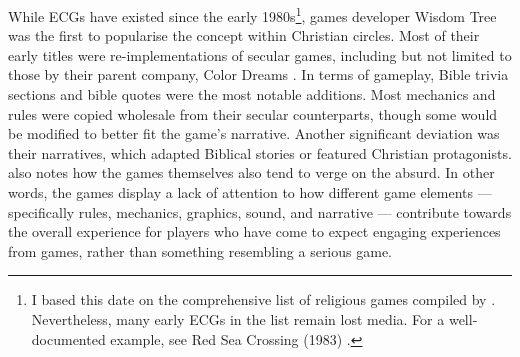 While \acp{ECG} have existed since the early 1980s\footnote{I based this date on the comprehensive list of religious games compiled by \textcite{gonzalez_religious_2022}. Nevertheless, many early \acp{ECG} in the list remain lost media. For a well-documented example, see Red Sea Crossing (1983) \parencite{lucky_chorus_2023, goldfarb_holy_2012}.}, games developer Wisdom Tree was the first to popularise the concept within Christian circles. Most of their early titles were re-implementations of secular games, including but not limited to those by their parent company, Color Dreams \parencite[287]{bogost_persuasive_2007}. In terms of gameplay, Bible trivia sections and bible quotes were the most notable additions. Most mechanics and rules were copied wholesale from their secular counterparts, though some would be modified to better fit the game's narrative. Another significant deviation was their narratives, which adapted Biblical stories or featured Christian protagonists. \textcite[287]{bogost_persuasive_2007} also notes how the games themselves also tend to verge on the absurd. In other words, the games display a lack of attention to how different game elements --- specifically rules, mechanics, graphics, sound, and narrative --- contribute towards the overall experience for players who have come to expect engaging experiences from games, rather than something resembling a serious game.







